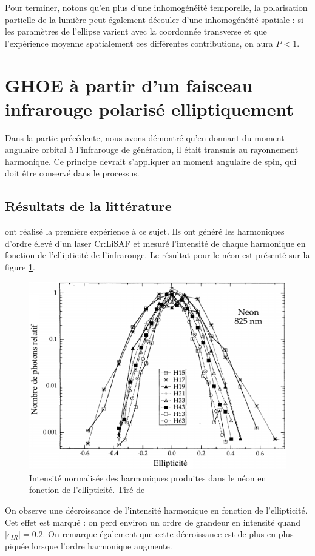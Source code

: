 Pour terminer, notons qu'en plus d'une inhomogénéité temporelle, la polarisation partielle de la lumière peut également découler d'une inhomogénéité spatiale : si les paramètres de l'ellipse varient avec la coordonnée transverse et que l'expérience moyenne spatialement ces différentes contributions, on aura $P<1$.

\section{GHOE à partir d'un faisceau infrarouge polarisé elliptiquement}
\label{sec:ghoepolar}
Dans la partie précédente, nous avons démontré qu'en donnant du moment angulaire orbital à l'infrarouge de génération, il était transmis au rayonnement harmonique. Ce principe devrait s'appliquer au moment angulaire de spin, qui doit être conservé dans le processus. 

\subsection{Résultats de la littérature}
 ont réalisé la première expérience à ce sujet. Ils ont généré les harmoniques d'ordre élevé d'un laser Cr:LiSAF et mesuré l'intensité de chaque harmonique en fonction de l'ellipticité de l'infrarouge. Le résultat pour le néon est présenté sur la figure \ref{Fig:budil}.
\begin{figure}[!ht]
\centering
\includegraphics[width=0.6\columnwidth]{Figures/Polar/Intensity_f_ellipticity_budil}%
\caption{Intensité normalisée des harmoniques produites dans le néon en fonction de l'ellipticité. Tiré de }%
\label{Fig:budil}%
\end{figure}

On observe une décroissance de l'intensité harmonique en fonction de l'ellipticité. Cet effet est marqué : on perd environ un ordre de grandeur en intensité quand $|\epsilon_{IR}| = 0.2$. On remarque également que cette décroissance est de plus en plus piquée lorsque l'ordre harmonique augmente.

